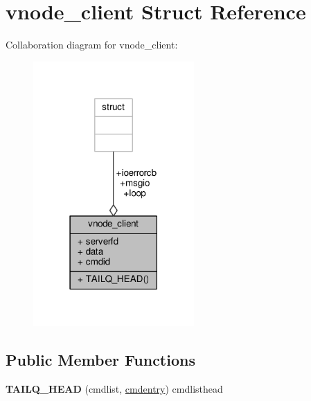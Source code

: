 \hypertarget{structvnode__client}{\section{vnode\+\_\+client Struct Reference}
\label{structvnode__client}
}


Collaboration diagram for vnode\+\_\+client\+:
\nopagebreak
\begin{figure}[H]
\begin{center}
\leavevmode
\includegraphics[width=174pt]{structvnode__client__coll__graph}
\end{center}
\end{figure}
\subsection*{Public Member Functions}
\begin{DoxyCompactItemize}
\item 
\hypertarget{structvnode__client_a1d011fcb0a39d32106627d7b34c21313}{{\bfseries T\+A\+I\+L\+Q\+\_\+\+H\+E\+A\+D} (cmdlist, \hyperlink{structcmdentry}{cmdentry}) cmdlisthead}\label{structvnode__client_a1d011fcb0a39d32106627d7b34c21313}

\end{DoxyCompactItemize}
